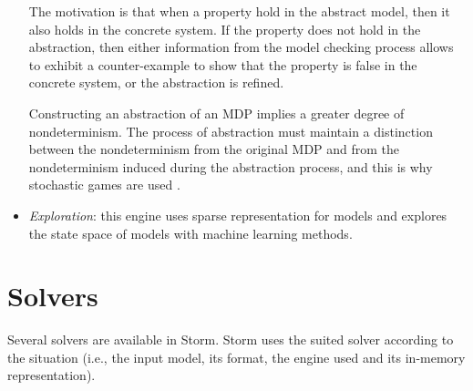 \begin{itemize}
  The motivation is that when a property hold in the abstract model, then it also holds in the concrete system.
  If the property does not hold in the abstraction, then either information from the model checking process allows to exhibit a counter-example to show that the property is false in the concrete system, or the abstraction is refined.
  \par Constructing an abstraction of an MDP implies a greater degree of nondeterminism.
  The process of abstraction must maintain a distinction between the nondeterminism from the original MDP and from the nondeterminism induced during the abstraction process, and this is why stochastic games are used \cite{DBLP:journals/fmsd/KattenbeltKNP10}.
  \item \textit{Exploration}: this engine uses sparse representation for models and explores the state space of models with machine learning methods.
\end{itemize}

\section{Solvers}
Several solvers are available in Storm.
Storm uses the suited solver according to the situation (i.e., the input model, its format, the engine used and its in-memory representation).

